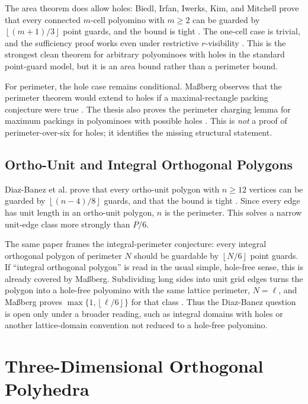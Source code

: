 \documentclass[11pt]{article}
\newcommand{\floor}[1]{\left\lfloor #1 \right\rfloor}
\begin{document}
The area theorem does allow holes: Biedl, Irfan, Iwerks, Kim, and Mitchell
prove that every connected $m$-cell polyomino with $m\geq 2$ can be guarded
by $\floor{(m+1)/3}$ point guards, and the bound is tight
\cite[Cor.~1]{BiedlEtAl2012}.  The one-cell case is trivial, and the
sufficiency proof works even under restrictive $r$-visibility
\cite[Theorem~1]{BiedlEtAl2012}.  This is the strongest clean theorem for
arbitrary polyominoes with holes in the standard point-guard model, but it is
an area bound rather than a perimeter bound.

For perimeter, the hole case remains conditional.  Ma{\ss}berg observes that
the perimeter theorem would extend to holes if a maximal-rectangle packing
conjecture were true \cite[Conj.~6.10]{MassbergHabilitation}.  The thesis
also proves the perimeter charging lemma for maximum packings in polyominoes
with possible holes \cite[Lem.~6.9]{MassbergHabilitation}.  This is
\emph{not} a proof of perimeter-over-six for holes; it identifies the missing
structural statement.

\subsection{Ortho-Unit and Integral Orthogonal Polygons}

Diaz-Banez et al. prove that every ortho-unit polygon with $n \geq 12$ vertices
can be guarded by $\floor{(n-4)/8}$ guards, and that the bound is tight
\cite{DiazBanezEtAl2025}.  Since every edge has unit length in an ortho-unit
polygon, $n$ is the perimeter.  This solves a narrow unit-edge class more
strongly than $P/6$.

The same paper frames the integral-perimeter conjecture: every integral
orthogonal polygon of perimeter $N$ should be guardable by $\floor{N/6}$ point
guards.  If ``integral orthogonal polygon'' is read in the usual simple,
hole-free sense, this is already covered by Ma{\ss}berg.  Subdividing long
sides into unit grid edges turns the polygon into a hole-free polyomino with
the same lattice perimeter, $N=\ell$, and Ma{\ss}berg proves
$\max\{1,\floor{\ell/6}\}$ for that class
\cite[Theorem~1]{Massberg2014}.  Thus the Diaz-Banez question is open only
under a broader reading, such as integral domains with holes or another
lattice-domain convention not reduced to a hole-free polyomino.

\section{Three-Dimensional Orthogonal Polyhedra}
\end{document}
